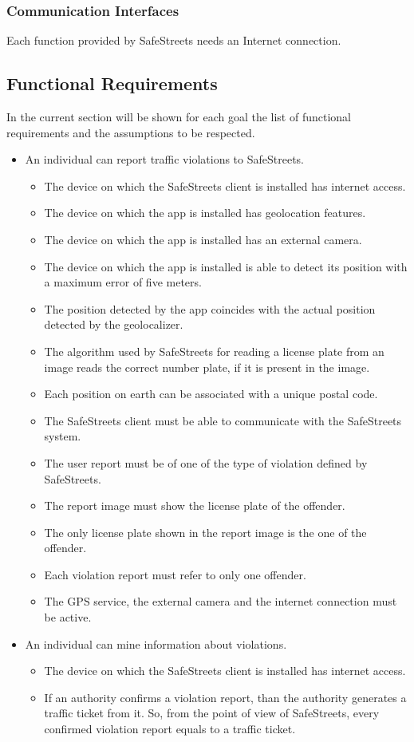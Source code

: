 \documentclass{article}
\newcommand\goal[1]{\item[{[G#1]}] }
\newcommand\requirement[1]{\item[{[R#1]}] }
\newcommand\assumption[1]{\item[{[A#1]}] }
\begin{document}
			\subsubsection{Communication Interfaces}
				Each function provided by SafeStreets needs an Internet connection.
		\subsection{Functional Requirements}
			In the current section will be shown for each goal the list of functional requirements and the assumptions to be respected.
			
			\begin{itemize}
				\goal{1}An individual can report traffic violations to SafeStreets.
				\begin{itemize}
					\assumption{1} The device on which the SafeStreets client is installed has internet access.
					\assumption{2} The device on which the app is installed has geolocation features.
					\assumption{3} The device on which the app is installed has an external camera.
					\assumption{4} The device on which the app is installed is able to detect its position with a maximum error of five meters.
					\assumption{5} The position detected by the app coincides with the actual position detected by the geolocalizer.
					\assumption{6} The algorithm used by SafeStreets for reading a license plate from an image reads the correct number plate, if it is present in the image.
					\assumption{8} Each position on earth can be associated with a unique postal code.
					\requirement{1} The SafeStreets client must be able to communicate with the SafeStreets system.
					\requirement{2} The user report must be of one of the type of violation defined by SafeStreets.
					\requirement{3} The report image must show the license plate of the offender.
					\requirement{4} The only license plate shown in the report image is the one of the offender.
					\requirement{5} Each violation report must refer to only one offender.	
					\requirement{6} The GPS service, the external camera and the internet connection must be active.
				\end{itemize}
				\goal{2}An individual can mine information about violations.
				\begin{itemize}
					\assumption{1} The device on which the SafeStreets client is installed has internet access.
					\assumption{9} If an authority confirms a violation report, than the authority generates a traffic ticket from it. So, from the point of view of 				SafeStreets, every confirmed violation report equals to a traffic ticket.

\end{itemize}
\end{itemize}
\end{document}
